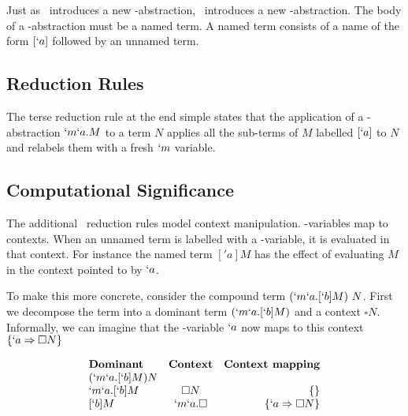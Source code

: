   Just as \lam\ introduces a new \lam-abstraction, \lmu\ introduces a new 
  \lmu-abstraction. The body of a \lmu-abstraction must be a named term. 
  A named term consists of a name of the form $[`a]$ followed by an unnamed 
  term. 

  \subsection{Reduction Rules}
  \begin{figure}[!h]
  \end{figure}

  The terse reduction rule at the end simple states that the application
  of a \lmu-abstraction $`m`a.M$ to a term $N$ applies all the sub-terms 
  of $M$ labelled $[`a]$ to $N$ and relabels them with a fresh $`m$ 
  variable.
  
  \subsection{Computational Significance}

  The additional \lmu\ reduction rules model context manipulation. 
  \lmu-variables map to contexts. When an unnamed term is labelled with a 
  \lmu-variable, it is evaluated in that context. For instance the named 
  term $['a]M$ has the effect of evaluating $M$ in the context pointed to 
  by $`a$.
  
  To make this more concrete, consider the compound term $(`m`a.[`b]M)\ N$. 
  First we decompose the term into a dominant term $(`m`a.[`b]M)$ and a 
  context $\square N$. Informally, we can imagine that the \lmu-variable 
  $`a$ now maps to this context $\{`a \Rightarrow \square N\}$
  
  \begin{example}[]
    \[
    \begin{array}{lcr}
    \textbf{Dominant} & \textbf{Context} & \textbf{Context mapping} \\
    (`m`a.[`b]M) N \\
    `m`a.[`b]M & \square N    & \{ \} \\
    {[`b]M}    & `m`a.\square & \{ `a \Rightarrow \square N \} \\
    \end{array}
    \]
  \end{example}

